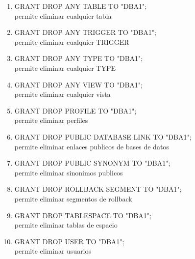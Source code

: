 \begin{enumerate}
\item GRANT DROP ANY TABLE TO "DBA1";
\\permite eliminar cualquier tabla
\item GRANT DROP ANY TRIGGER TO "DBA1";
\\permite eliminar cualquier TRIGGER
\item GRANT DROP ANY TYPE TO "DBA1";
\\permite eliminar cualquier TYPE
\item GRANT DROP ANY VIEW TO "DBA1";
\\permite eliminar cualquier vista
\item GRANT DROP PROFILE TO "DBA1";
\\permite eliminar perfiles
\item GRANT DROP PUBLIC DATABASE LINK TO "DBA1";
\\permite eliminar enlaces publicos de bases de datos
\item GRANT DROP PUBLIC SYNONYM TO "DBA1";
\\permite eliminar sinonimos publicos
\item GRANT DROP ROLLBACK SEGMENT TO "DBA1";
\\permite eliminar segmentos de rollback
\item GRANT DROP TABLESPACE TO "DBA1";
\\permite eliminar tablas de espacio
\item GRANT DROP USER TO "DBA1";
\\permite eliminar usuarios
\end{enumerate}